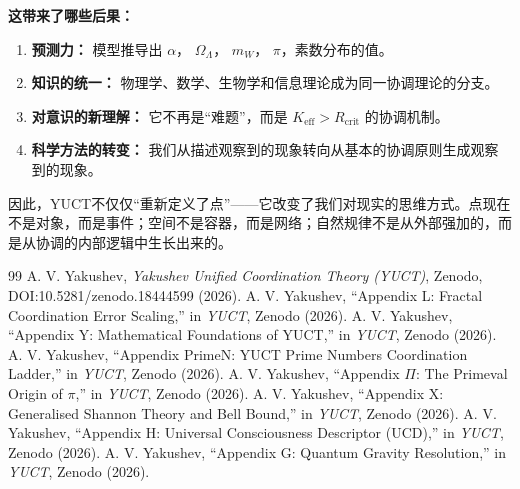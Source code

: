 \documentclass[12pt,a4paper]{article}
\newcommand{\Keff}{K_{\mathrm{eff}}}
\newcommand{\Rcrit}{R_{\mathrm{crit}}}
\begin{document}
	\medskip
	\textbf{这带来了哪些后果：}
	\begin{enumerate}
		\item \textbf{预测力：} 模型推导出 \(\alpha\)， \(\Omega_\Lambda\)， \(m_W\)， \(\pi\)，素数分布的值。
		\item \textbf{知识的统一：} 物理学、数学、生物学和信息理论成为同一协调理论的分支。
		\item \textbf{对意识的新理解：} 它不再是“难题”，而是 \(\Keff > \Rcrit\) 的协调机制。
		\item \textbf{科学方法的转变：} 我们从描述观察到的现象转向从基本的协调原则生成观察到的现象。
	\end{enumerate}
	
	\medskip
	因此，YUCT不仅仅“重新定义了点”——它改变了我们对现实的思维方式。点现在不是对象，而是事件；空间不是容器，而是网络；自然规律不是从外部强加的，而是从协调的内部逻辑中生长出来的。
	
	\begin{thebibliography}{99}
		 A. V. Yakushev, \emph{Yakushev Unified Coordination Theory (YUCT)}, Zenodo, DOI:10.5281/zenodo.18444599 (2026).
		 A. V. Yakushev, ``Appendix L: Fractal Coordination Error Scaling,'' in \emph{YUCT}, Zenodo (2026).
		 A. V. Yakushev, ``Appendix Y: Mathematical Foundations of YUCT,'' in \emph{YUCT}, Zenodo (2026).
		 A. V. Yakushev, ``Appendix PrimeN: YUCT Prime Numbers Coordination Ladder,'' in \emph{YUCT}, Zenodo (2026).
		 A. V. Yakushev, ``Appendix \(\Pi\): The Primeval Origin of \(\pi\),'' in \emph{YUCT}, Zenodo (2026).
		 A. V. Yakushev, ``Appendix X: Generalised Shannon Theory and Bell Bound,'' in \emph{YUCT}, Zenodo (2026).
		 A. V. Yakushev, ``Appendix H: Universal Consciousness Descriptor (UCD),'' in \emph{YUCT}, Zenodo (2026).
		 A. V. Yakushev, ``Appendix G: Quantum Gravity Resolution,'' in \emph{YUCT}, Zenodo (2026).
	\end{thebibliography}
	
\end{document}
